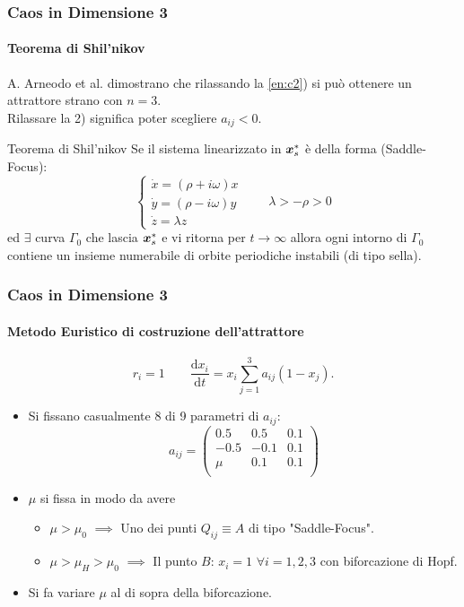 \begin{frame}
\frametitle{Caos in Dimensione 3}
\framesubtitle{Teorema di Shil'nikov}
A. Arneodo et al. dimostrano che rilassando la \ref{en:c2}) si può ottenere un attrattore strano con $n=3$.\\
Rilassare la 2) significa poter scegliere $a_{ij} < 0$.
\begin{block}{Teorema di Shil'nikov}
Se il sistema linearizzato in $\boldsymbol{x}^*_s$ è della forma (Saddle-Focus):
\[
    \begin{cases}
	\dot{x} = \left(\rho  + i\omega\right) x \\
	\dot{y} = \left(\rho  - i\omega\right) y \\
	\dot{z} = \lambda z
    \end{cases} 
    \qquad \lambda > -\rho > 0
\] 
ed $\exists$ curva $\Gamma_0$ che lascia $\boldsymbol{x}^*_s$ e vi ritorna per $t\to \infty$ allora ogni intorno di $\Gamma_0$ contiene un insieme numerabile di orbite periodiche instabili (di tipo sella).
\end{block}
\end{frame}

\begin{frame}
\frametitle{Caos in Dimensione 3}
\framesubtitle{Metodo Euristico di costruzione dell'attrattore}
\[
    r_i = 1 \qquad \frac{\text{d} x_i}{\text{d} t} = x_i \sum_{j=1}^{3} a_{ij}(1-x_j) 
.\] 
\begin{itemize}
    \item Si fissano casualmente 8 di 9 parametri di $a_{ij}$:
	\[
	    a_{ij} =\begin{pmatrix}
	        0.5 & 0.5 & 0.1 \\
	        -0.5 & -0.1 & 0.1 \\
	        \mu & 0.1 & 0.1 \\
	    \end{pmatrix}
	\] 
    \item $\mu$ si fissa in modo da avere
	\begin{itemize}
	    \item $\mu  > \mu_0$ $\implies$ Uno dei punti $Q_{ij}\equiv A$ di tipo "Saddle-Focus".
	    \item $\mu > \mu_H > \mu_0$ $\implies$ Il punto $B$: $x_i=1$ $\forall i = 1, 2, 3$ con biforcazione di Hopf.
	\end{itemize}
    \item Si fa variare $\mu$ al di sopra della biforcazione.
\end{itemize}
\end{frame}

